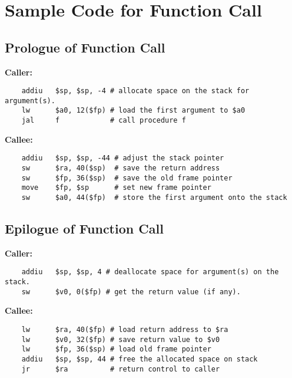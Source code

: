\documentclass[a4paper,11pt]{article}
\begin{document}
\newpage
\appendix

\section{Sample Code for Function Call}
\subsection{Prologue of Function Call}
\textbf{Caller:}
\begin{lstlisting}
    addiu   $sp, $sp, -4 # allocate space on the stack for argument(s).
    lw      $a0, 12($fp) # load the first argument to $a0
    jal     f            # call procedure f

\end{lstlisting}

\noindent \textbf{Callee:}
\begin{lstlisting}
    addiu   $sp, $sp, -44 # adjust the stack pointer
    sw      $ra, 40($sp)  # save the return address
    sw      $fp, 36($sp)  # save the old frame pointer
    move    $fp, $sp      # set new frame pointer
    sw      $a0, 44($fp)  # store the first argument onto the stack
\end{lstlisting}

\subsection{Epilogue of Function Call}
\textbf{Caller:}
\begin{lstlisting}
    addiu   $sp, $sp, 4 # deallocate space for argument(s) on the stack.
    sw      $v0, 0($fp) # get the return value (if any).
\end{lstlisting}

\noindent \textbf{Callee:}
\begin{lstlisting}
    lw      $ra, 40($fp) # load return address to $ra
    lw      $v0, 32($fp) # save return value to $v0
    lw      $fp, 36($sp) # load old frame pointer
    addiu   $sp, $sp, 44 # free the allocated space on stack
    jr      $ra          # return control to caller
\end{lstlisting}
\end{document}
